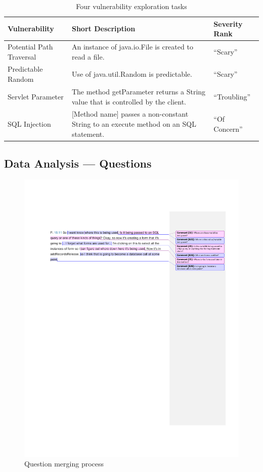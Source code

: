 \documentclass[10pt,journal,compsoc]{IEEEtran}
\begin{document}
\begin{table} 
	\centering
	\caption{Four vulnerability exploration tasks}
	\begin{tabularx}{\textwidth}{|l|X|l|}
		\rowcolor{gray!50}
		\hline
		Vulnerability				& Short Description													& Severity Rank 	\\
		\hline	
		Potential Path Traversal	& An instance of java.io.File is created to read a file.     			& ``Scary''	    \\
		\hline
		Predictable Random			& Use of java.util.Random is predictable. 								& ``Scary''		\\
		\hline
		Servlet Parameter 			& The method getParameter returns a String value that is controlled by the client.			& ``Troubling''	\\
		\hline
		SQL Injection				& [Method name] passes a non-constant String to an execute method on an SQL statement.     	& ``Of Concern'' \\
		\hline
	\end{tabularx}
	\label{table:vulnerabilities}
\end{table}

\subsection{Data Analysis --- Questions}
\begin{figure}
	\centering
	\includegraphics[trim={0 0 0 3mm},clip, width=\textwidth]{Images/QuestionMerging}
	\caption{Question merging process}
	\label{fig:merging} 
\end{figure}
\end{document}
